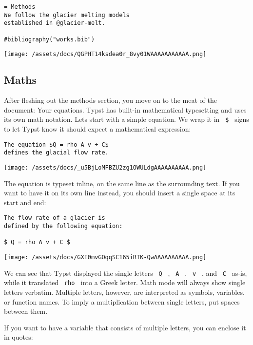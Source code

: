 \begin{verbatim}
= Methods
We follow the glacier melting models
established in @glacier-melt.

#bibliography("works.bib")
\end{verbatim}

\texttt{[image: /assets/docs/QGPHT14ksdea0r\_8vy01WAAAAAAAAAAA.png]}

\subsection{Maths}\label{maths}

After fleshing out the methods section, you move on to the meat of the
document: Your equations. Typst has built-in mathematical typesetting
and uses its own math notation. Let\textquotesingle s start with a
simple equation. We wrap it in \texttt{\ \$\ } signs to let Typst know
it should expect a mathematical expression:

\begin{verbatim}
The equation $Q = rho A v + C$
defines the glacial flow rate.
\end{verbatim}

\texttt{[image: /assets/docs/\_u5BjLoMFBZU2zg1OWULdgAAAAAAAAAA.png]}

The equation is typeset inline, on the same line as the surrounding
text. If you want to have it on its own line instead, you should insert
a single space at its start and end:

\begin{verbatim}
The flow rate of a glacier is
defined by the following equation:

$ Q = rho A v + C $
\end{verbatim}

\texttt{[image: /assets/docs/GXI0mvGOqqSC165iRTK-QwAAAAAAAAAA.png]}

We can see that Typst displayed the single letters \texttt{\ Q\ } ,
\texttt{\ A\ } , \texttt{\ v\ } , and \texttt{\ C\ } as-is, while it
translated \texttt{\ rho\ } into a Greek letter. Math mode will always
show single letters verbatim. Multiple letters, however, are interpreted
as symbols, variables, or function names. To imply a multiplication
between single letters, put spaces between them.

If you want to have a variable that consists of multiple letters, you
can enclose it in quotes:

